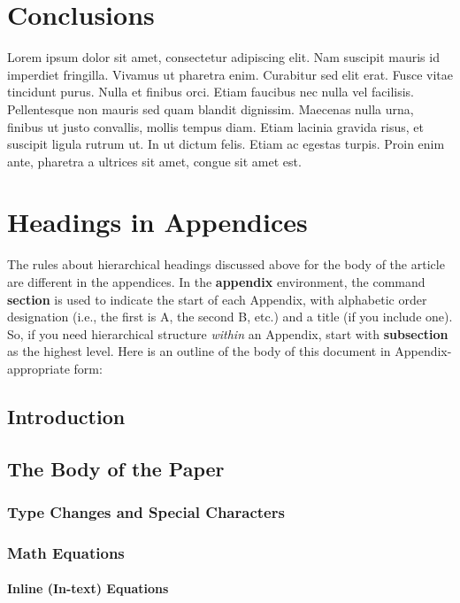 \section{Conclusions}
Lorem ipsum dolor sit amet, consectetur adipiscing elit. Nam suscipit mauris id imperdiet fringilla. Vivamus ut pharetra enim. Curabitur sed elit erat. Fusce vitae tincidunt purus. Nulla et finibus orci. Etiam faucibus nec nulla vel facilisis. Pellentesque non mauris sed quam blandit dignissim. Maecenas nulla urna, finibus ut justo convallis, mollis tempus diam. Etiam lacinia gravida risus, et suscipit ligula rutrum ut. In ut dictum felis. Etiam ac egestas turpis. Proin enim ante, pharetra a ultrices sit amet, congue sit amet est.




\appendix
\section{Headings in Appendices}
The rules about hierarchical headings discussed above for
the body of the article are different in the appendices.
In the \textbf{appendix} environment, the command
\textbf{section} is used to
indicate the start of each Appendix, with alphabetic order
designation (i.e., the first is A, the second B, etc.) and
a title (if you include one).  So, if you need
hierarchical structure
\textit{within} an Appendix, start with \textbf{subsection} as the
highest level. Here is an outline of the body of this
document in Appendix-appropriate form:
\subsection{Introduction}
\subsection{The Body of the Paper}
\subsubsection{Type Changes and  Special Characters}
\subsubsection{Math Equations}
\paragraph{Inline (In-text) Equations}
